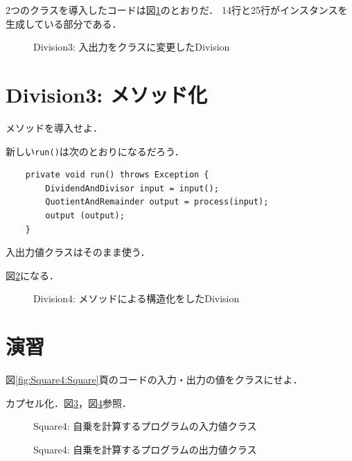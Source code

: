 \documentclass[a4j, twoside]{jsbook}
\begin{document}
2つのクラスを導入したコードは図\ref{fig:Division3:Division}のとおりだ．
14行と25行がインスタンスを生成している部分である．

\begin{figure}
 
 \caption{Division3: 入出力をクラスに変更したDivision}\label{fig:Division3:Division}
\end{figure}

\section{Division3: メソッド化}
\begin{例題}
 メソッドを導入せよ．
\end{例題}

新しい\texttt{run()}は次のとおりになるだろう．

\begin{verbatim}
	private void run() throws Exception {
	    DividendAndDivisor input = input();
	    QuotientAndRemainder output = process(input);
	    output (output);
	}
\end{verbatim}

入出力値クラスはそのまま使う．

図\ref{fig:Division4:Division}になる．

\begin{figure}
 
 \caption{Division4: メソッドによる構造化をしたDivision}\label{fig:Division4:Division}
\end{figure}

\newpage

\section{演習}
\begin{演習}
 図\ref{fig:Square4:Square}頁のコードの入力・出力の値をクラスにせよ．
\end{演習}

カプセル化．図\ref{fig:Square4:ValueToBeSquared}，図\ref{fig:Square4:SquaredValue}参照．

\begin{figure}
 
 \caption{Square4: 自乗を計算するプログラムの入力値クラス}\label{fig:Square4:ValueToBeSquared}
\end{figure}

\begin{figure}
 
 \caption{Square4: 自乗を計算するプログラムの出力値クラス}\label{fig:Square4:SquaredValue}
\end{figure}
\end{document}
